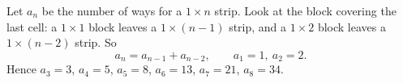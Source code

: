 Let $a_n$ be the number of ways for a $1\times n$ strip. Look at the block covering the last cell: a $1\times1$ block leaves a $1\times(n-1)$ strip, and a $1\times2$ block leaves a $1\times(n-2)$ strip. So
\[
a_n=a_{n-1}+a_{n-2},\qquad a_1=1,\ a_2=2 .
\]
Hence $a_3=3$, $a_4=5$, $a_5=8$, $a_6=13$, $a_7=21$, $a_8=\boxed{34}$.
